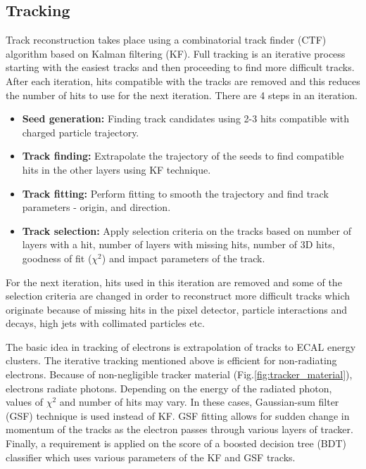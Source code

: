 \subsection{Tracking}
Track reconstruction takes place using a combinatorial track finder (CTF) algorithm based on Kalman filtering (KF). Full tracking is an iterative process starting with the easiest tracks and then proceeding to find more difficult tracks. After each iteration, hits compatible with the tracks are removed and this reduces the number of hits to use for the next iteration. There are 4 steps in an iteration.
\begin{itemize}
\item \textbf{Seed generation:} Finding track candidates using 2-3 hits compatible with charged particle trajectory.
\item \textbf{Track finding:} Extrapolate the trajectory of the seeds to find compatible hits in the other layers using KF technique.
\item \textbf{Track fitting:} Perform fitting to smooth the trajectory and find track parameters - origin, \pt and direction.
\item \textbf{Track selection:} Apply selection criteria on the tracks based on number of layers with a hit, number of layers with missing hits, number of 3D hits, goodness of fit ($\chi^2$) and impact parameters of the track.
\end{itemize}
For the next iteration, hits used in this iteration are removed and some of the selection criteria are changed in order to reconstruct more difficult tracks which originate because of missing hits in the pixel detector, particle interactions and decays, high \pt jets with collimated particles etc.

The basic idea in tracking of electrons is extrapolation of tracks to ECAL energy clusters. The iterative tracking mentioned above is efficient for non-radiating electrons. Because of non-negligible tracker material (Fig.\ref{fig:tracker_material}), electrons radiate photons. Depending on the energy of the radiated photon, values of $\chi^2$ and number of hits may vary. In these cases, Gaussian-sum filter (GSF) technique \cite{Adam_2005} is used instead of KF. GSF fitting allows for sudden change in momentum of the tracks as the electron passes through various layers of tracker. Finally, a requirement is applied on the score of a boosted decision tree (BDT) classifier which uses various parameters of the KF and GSF tracks.

